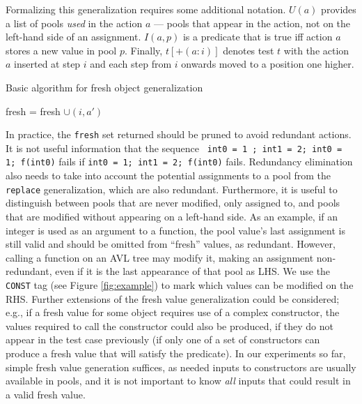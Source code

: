 Formalizing this generalization requires some additional notation.
$U(a)$ provides a list of pools \emph{used} in the action $a$ --- pools that
appear in the action, not on the left-hand side of an assignment.
$I(a,p)$ is a predicate that is true iff action $a$ stores a new value
in pool $p$.  Finally, $t[+(a: i)]$ denotes test $t$ with the action
$a$ inserted at step $i$ and each step from $i$ onwards moved to a
position one higher.

\begin{algorithm}
\caption{Basic algorithm for fresh object generalization}
\label{freshalg}
\begin{algorithmic}[1]
\State fresh = fresh $\cup (i,a')$
\EndIf
\EndFor 
\EndFor
\EndFor
{}
\end{algorithmic}
\end{algorithm}

In practice, the {\tt fresh} set returned should be pruned to avoid
redundant actions.  It is not useful information that the sequence {\tt
  int0 = 1 ; int1 = 2; int0 = 1; f(int0)} fails if {\tt int0 = 1; int1
  = 2; f(int0)} fails.  Redundancy elimination also needs to take into
account the potential assignments to a pool from the {\tt replace}
generalization, which are also redundant.  Furthermore, it is useful
to distinguish between pools that are never modified, only assigned
to, and pools that are modified without appearing on a left-hand
side.  As an example, if an integer is used as an argument to a
function, the pool value's last assignment is still valid and should
be omitted from ``fresh'' values, as redundant.  However, calling a
function on an AVL tree may modify it, making an
assignment non-redundant, even if it is the last appearance of that
pool as LHS.  We use the {\tt CONST} tag (see Figure \ref{fig:example}) to mark
which values can be modified on the RHS.  Further extensions of the fresh value generalization
could be considered; e.g., if a fresh value for some object requires use
of a complex constructor, the values required to call the constructor
could also be produced, if they do not appear in the test case
previously (if only one of a set of constructors can produce a fresh
value that will satisfy the predicate).  In our experiments
so far, simple fresh value generation suffices, as needed
inputs to constructors are usually available in pools, and it is not
important to know \emph{all} inputs that could result in a
valid fresh value.


